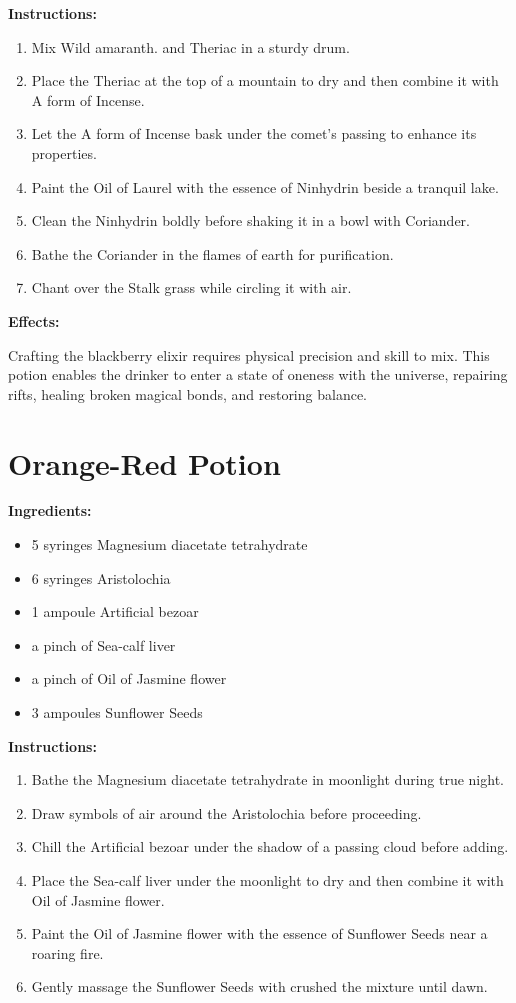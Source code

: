 \documentclass{article}
\begin{document}
\textbf{Instructions:}

\begin{enumerate}
  \item Mix Wild amaranth. and Theriac in a sturdy drum.
  \item Place the Theriac at the top of a mountain to dry and then combine it with A form of Incense.
  \item Let the A form of Incense bask under the comet’s passing to enhance its properties.
  \item Paint the Oil of Laurel with the essence of Ninhydrin beside a tranquil lake.
  \item Clean the Ninhydrin boldly before shaking it in a bowl with Coriander.
  \item Bathe the Coriander in the flames of earth for purification.
  \item Chant over the Stalk grass while circling it with air.
\end{enumerate}

\textbf{Effects:}

Crafting the blackberry elixir requires physical precision and skill to mix. This potion enables the drinker to enter a state of oneness with the universe, repairing rifts, healing broken magical bonds, and restoring balance.

\newpage
\section*{Orange-Red Potion}

\textbf{Ingredients:}

\begin{itemize}
  \item 5 syringes Magnesium diacetate tetrahydrate
  \item 6 syringes Aristolochia
  \item 1 ampoule Artificial bezoar
  \item a pinch of Sea-calf liver
  \item a pinch of Oil of Jasmine flower
  \item 3 ampoules Sunflower Seeds
\end{itemize}

\textbf{Instructions:}

\begin{enumerate}
  \item Bathe the Magnesium diacetate tetrahydrate in moonlight during true night.
  \item Draw symbols of air around the Aristolochia before proceeding.
  \item Chill the Artificial bezoar under the shadow of a passing cloud before adding.
  \item Place the Sea-calf liver under the moonlight to dry and then combine it with Oil of Jasmine flower.
  \item Paint the Oil of Jasmine flower with the essence of Sunflower Seeds near a roaring fire.
  \item Gently massage the Sunflower Seeds with crushed the mixture until dawn.
\end{enumerate}
\end{document}
